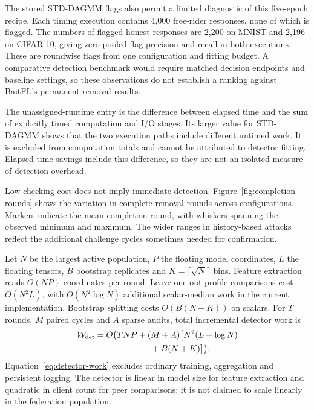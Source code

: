 \documentclass[journal]{IEEEtran}
\makeatletter
\renewcommand{\section}{\@startsection{section}{1}{\z@}{1.5ex}{0.7ex}{\normalfont\normalsize\centering\scshape}}
\makeatother
\begin{document}
The stored STD-DAGMM flags also permit a limited diagnostic of this
five-epoch recipe. Each timing execution contains 4,000 free-rider
responses, none of which is flagged. The numbers of flagged honest
responses are 2,200 on MNIST and 2,196 on CIFAR-10, giving zero pooled
flag precision and recall in both executions. These are roundwise flags
from one configuration and fitting budget. A comparative detection
benchmark would require matched decision endpoints and baseline settings,
so these observations do not establish a ranking against BaitFL's
permanent-removal results.

The unassigned-runtime entry is the difference between elapsed time and
the sum of explicitly timed computation and I/O stages. Its larger value
for STD-DAGMM shows that the two execution paths include different
untimed work. It is excluded from computation totals and cannot be
attributed to detector fitting. Elapsed-time savings include this
difference, so they are not an isolated measure of detection overhead.

Low checking cost does not imply immediate detection.
Figure~\ref{fig:completion-rounds} shows the variation in complete-removal
rounds across configurations. Markers indicate the mean completion round,
with whiskers spanning the observed minimum and maximum.
The wider ranges in history-based attacks
reflect the additional challenge cycles sometimes needed for confirmation.


\section{Complexity and Lightweight Design}\label{sec:complexity}
Let $N$ be the largest active population, $P$ the floating model coordinates,
$L$ the floating tensors, $B$ bootstrap replicates and
$K=\lceil\sqrt N\rceil$ bins. Feature extraction reads $O(NP)$ coordinates
per round. Leave-one-out profile comparisons cost $O(N^2L)$, with
$O(N^2\log N)$ additional scalar-median work in the current implementation.
Bootstrap splitting costs $O(B(N+K))$ on scalars. For $T$ rounds, $M$
paired cycles and $A$ sparse audits, total incremental detector work is
\begin{equation}\label{eq:detector-work}
\begin{aligned}
\mathcal W_{\rm det}=O\bigl(&TNP+(M+A)\bigl[N^2(L+\log N)\\
&\hspace{4em}+B(N+K)\bigr]\bigr).
\end{aligned}
\end{equation}
Equation~\eqref{eq:detector-work} excludes ordinary training, aggregation
and persistent logging. The detector is linear in model size for feature
extraction and quadratic in client count for peer comparisons; it is not
claimed to scale linearly in the federation population.
\end{document}
